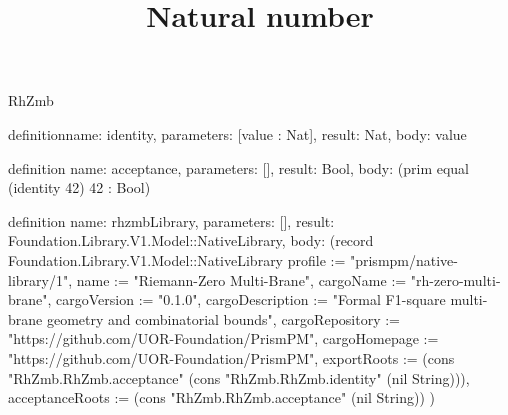 \begin{lexlean}{RhZmb}
\title{Natural number}
\begin{semanticmodule}
definition{name: identity, parameters: [value : Nat], result: Nat, body: value}

definition{
  name: acceptance,
  parameters: [],
  result: Bool,
  body: (prim equal (identity 42) 42 : Bool)
}

definition{
  name: rhzmbLibrary,
  parameters: [],
  result: Foundation.Library.V1.Model::NativeLibrary,
  body: (record Foundation.Library.V1.Model::NativeLibrary {
    profile := "prismpm/native-library/1",
    name := "Riemann-Zero Multi-Brane",
    cargoName := "rh-zero-multi-brane",
    cargoVersion := "0.1.0",
    cargoDescription := "Formal F1-square multi-brane geometry and combinatorial bounds",
    cargoRepository := "https://github.com/UOR-Foundation/PrismPM",
    cargoHomepage := "https://github.com/UOR-Foundation/PrismPM",
    exportRoots := (cons "RhZmb.RhZmb.acceptance" (cons "RhZmb.RhZmb.identity" (nil String))),
    acceptanceRoots := (cons "RhZmb.RhZmb.acceptance" (nil String))
  })
}
\end{semanticmodule}
\end{lexlean}

